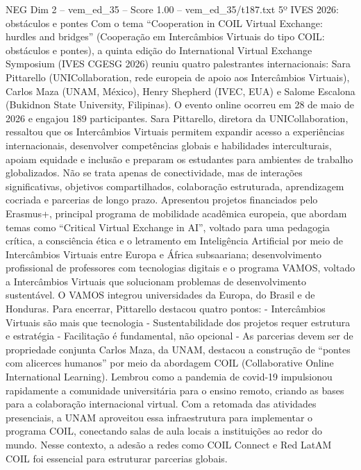 \begin{textsample}{NEG Dim 2 – vem\_ed\_35 – Score 1.00 – vem\_ed\_35/t187.txt}  \label{ex:f2_neg_066}
5º IVES 2026: obstáculos e pontes Com o tema “Cooperation in COIL Virtual Exchange: hurdles and bridges” (Cooperação em Intercâmbios Virtuais do tipo COIL: obstáculos e pontes), a quinta edição do International Virtual Exchange Symposium (IVES CGESG 2026) reuniu quatro palestrantes internacionais: Sara Pittarello (UNICollaboration, rede europeia de apoio aos Intercâmbios Virtuais), Carlos Maza (UNAM, México), Henry Shepherd (IVEC, EUA) e Salome Escalona (Bukidnon State University, Filipinas).
O evento online ocorreu em 28 de maio de 2026 e engajou 189 participantes.
Sara Pittarello, diretora da UNICollaboration, ressaltou que os Intercâmbios Virtuais permitem expandir acesso a experiências internacionais, desenvolver competências globais e habilidades interculturais, apoiam equidade e inclusão e preparam os estudantes para ambientes de trabalho globalizados.
Não se trata apenas de conectividade, mas de interações significativas, objetivos compartilhados, colaboração estruturada, aprendizagem cocriada e parcerias de longo prazo.
Apresentou projetos financiados pelo Erasmus+, principal programa de mobilidade acadêmica europeia, que abordam temas como “Critical Virtual Exchange in AI”, voltado para uma pedagogia crítica, a consciência ética e o letramento em Inteligência Artificial por meio de Intercâmbios Virtuais entre Europa e África subsaariana; desenvolvimento profissional de professores com tecnologias digitais e o programa VAMOS, voltado a Intercâmbios Virtuais que solucionam problemas de desenvolvimento sustentável.
O VAMOS integrou universidades da Europa, do Brasil e de Honduras.
Para encerrar, Pittarello destacou quatro pontos: - Intercâmbios Virtuais são mais que tecnologia - Sustentabilidade dos projetos requer estrutura e estratégia - Facilitação é fundamental, não opcional - As parcerias devem ser de propriedade conjunta Carlos Maza, da UNAM, destacou a construção de “pontes com alicerces humanos” por meio da abordagem COIL (Collaborative Online International Learning).
Lembrou como a pandemia de covid-19 impulsionou rapidamente a comunidade universitária para o ensino remoto, criando as bases para a colaboração internacional virtual.
Com a retomada das atividades presenciais, a UNAM aproveitou essa infraestrutura para implementar o programa COIL, conectando salas de aula locais a instituições ao redor do mundo.
Nesse contexto, a adesão a redes como COIL Connect e Red LatAM COIL foi essencial para estruturar parcerias globais.

\end{textsample}
